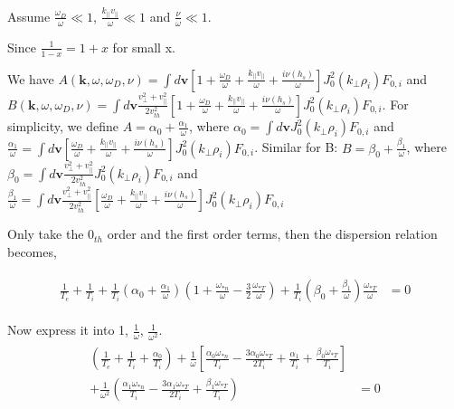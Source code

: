 Assume $\frac{\omega_{D}}{\omega} \ll 1$, $\frac{k_{||}v_{||}}{\omega} \ll 1$ and $\frac{\nu}{\omega} \ll 1$. 

Since $\frac{1}{1-x}=1+x$ for small x.

We have $A(\textbf{k},\omega, \omega_D ,\nu)=
\int d\textbf{v} \left[
1 +\frac{\omega_D }{\omega}
    + \frac{k_{||}v_{||}}{\omega}
    +\frac{i\nu(h_s)}{\omega}\right]
    J_0^2(k_\perp\rho_i)F_{0,i}$ 
    and 
    $B(\textbf{k},\omega, \omega_D ,\nu)=
\int d\textbf{v} 
\frac{v^2_{\perp}+v_{||}^2}{2v_{th}^2}
\left[
1 +\frac{\omega_D }{\omega}
    + \frac{k_{||}v_{||}}{\omega}+\frac{i\nu(h_s)}{\omega}\right]
    J_0^2(k_\perp\rho_i)F_{0,i}$.
    For simplicity, we define $A=\alpha_0+\frac{\alpha_1}{\omega}$, where $\alpha_0=\int d\textbf{v} 
    J_0^2(k_\perp\rho_i)F_{0,i}$ and\\
    $\frac{\alpha_1}{\omega}=
    \int d\textbf{v} \left[
\frac{\omega_D }{\omega}
    + \frac{k_{||}v_{||}}{\omega}
    +\frac{i\nu(h_s)}{\omega}\right]
    J_0^2(k_\perp\rho_i)F_{0,i}$. Similar for B: $B=\beta_0+\frac{\beta_1}{\omega}$, 
    where 
    $\beta_0=\int d\textbf{v} \frac{v^2_{\perp}+v_{||}^2}{2v_{th}^2}
    J_0^2(k_\perp\rho_i)F_{0,i}$ and\\
    $\frac{\beta_1}{\omega}=
    \int d\textbf{v} \frac{v^2_{\perp}+v_{||}^2}{2v_{th}^2}
    \left[
\frac{\omega_D }{\omega}
    + \frac{k_{||}v_{||}}{\omega}
    +\frac{i\nu(h_s)}{\omega}\right]
    J_0^2(k_\perp\rho_i)F_{0,i}$
    
    Only take the $0_{th}$ order and the first order terms, then the dispersion relation becomes, 
    
    \begin{eqnarray}
        \begin{aligned}
    \frac{1}{T_e}+
    \frac{1}{T_i}+
    \frac{1}{T_i}(\alpha_0+\frac{\alpha_1}{\omega})\left(1+\frac{\omega_{*n}}{\omega}-\frac{3}{2}\frac{\omega_{*T}}{\omega}\right)+\frac{1}{T_i}(\beta_0+\frac{\beta_1}{\omega})\frac{\omega_{*T}}{\omega}{}&=0
    \end{aligned}
    \end{eqnarray}
    
    Now express it into 1, $\frac{1}{\omega}$, $\frac{1}{\omega^2}$. 
    \begin{eqnarray}
        \begin{aligned}
    \left(
    \frac{1}{T_e}+
    \frac{1}{T_i}+
    \frac{\alpha_0}{ T_i}
    \right)+
    \frac{1}{\omega}
    \left[
    \frac{\alpha_0\omega_{*n}}{T_i}-
    \frac{3\alpha_0\omega_{*T}}{2 T_i}+
    \frac{\alpha_1}{T_i}+
    \frac{\beta_0\omega_{*T}}{T_i}
    \right]\\
    +
    \frac{1}{\omega^2}
    \left(
    \frac{\alpha_1\omega_{*n}}{ T_i}-
    \frac{3\alpha_1\omega_{*T}}{2 T_i}+
    \frac{\beta_1\omega_{*T}}{T_i}
    \right)
    &=0
    \end{aligned}
    \end{eqnarray}
    
